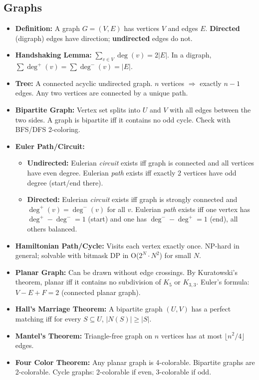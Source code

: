 \subsection{Graphs}

\begin{itemize}
    \item \textbf{Definition: }A graph $G = (V, E)$ has vertices $V$ and edges $E$. \textbf{Directed} (digraph) edges have direction; \textbf{undirected} edges do not.
    \item \textbf{Handshaking Lemma: }$\sum_{v \in V} \deg(v) = 2|E|$. In a digraph, $\sum \deg^+(v) = \sum \deg^-(v) = |E|$.
    \item \textbf{Tree: }A connected acyclic undirected graph. $n$ vertices $\Rightarrow$ exactly $n-1$ edges. Any two vertices are connected by a unique path.
    \item \textbf{Bipartite Graph: }Vertex set splits into $U$ and $V$ with all edges between the two sides. A graph is bipartite iff it contains no odd cycle. Check with BFS/DFS 2-coloring.
    \item \textbf{Euler Path/Circuit: }
          \begin{itemize}
              \item \textbf{Undirected:} Eulerian \textit{circuit} exists iff graph is connected and all vertices have even degree. Eulerian \textit{path} exists iff exactly 2 vertices have odd degree (start/end there).
              \item \textbf{Directed:} Eulerian \textit{circuit} exists iff graph is strongly connected and $\deg^+(v) = \deg^-(v)$ for all $v$. Eulerian \textit{path} exists iff one vertex has $\deg^+ - \deg^- = 1$ (start) and one has $\deg^- - \deg^+ = 1$ (end), all others balanced.
          \end{itemize}
    \item \textbf{Hamiltonian Path/Cycle: }Visits each vertex exactly once. NP-hard in general; solvable with bitmask DP in O($2^N \cdot N^2$) for small $N$.
    \item \textbf{Planar Graph: }Can be drawn without edge crossings. By Kuratowski's theorem, planar iff it contains no subdivision of $K_5$ or $K_{3,3}$. Euler's formula: $V - E + F = 2$ (connected planar graph).
    \item \textbf{Hall's Marriage Theorem: }A bipartite graph $(U, V)$ has a perfect matching iff for every $S \subseteq U$, $|N(S)| \geq |S|$.
    \item \textbf{Mantel's Theorem: }Triangle-free graph on $n$ vertices has at most $\lfloor n^2/4 \rfloor$ edges.
    \item \textbf{Four Color Theorem: }Any planar graph is 4-colorable. Bipartite graphs are 2-colorable. Cycle graphs: 2-colorable if even, 3-colorable if odd.
\end{itemize}
